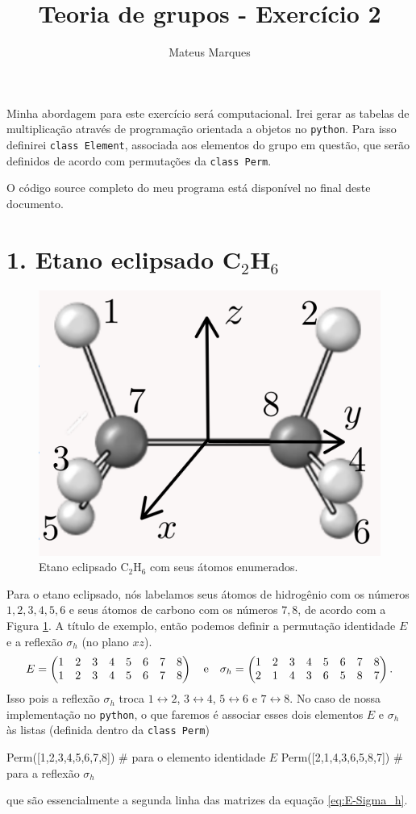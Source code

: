 \documentclass[a4paper,10pt]{article}
\title{\Huge{\textbf{Teoria de grupos - Exercício 2}}}
\author{Mateus Marques}
\newcommand{\python}[1]{\texttt{#1}}
\newcommand{\lr}{\leftrightarrow}
\begin{document}
\maketitle

Minha abordagem para este exercício será computacional. Irei gerar as tabelas de multiplicação através de programação orientada a objetos no \python{python}. Para isso definirei \python{class Element}, associada aos elementos do grupo em questão, que serão definidos de acordo com permutações da \python{class Perm}.

O código source completo do meu programa está disponível no final deste documento.


\section*{1. Etano eclipsado C$_2$H$_6$}

\begin{figure}[H]
\centering
\includegraphics[width=0.3\linewidth]{fig/etano_eclipsado.png}
\caption{Etano eclipsado C$_2$H$_6$ com seus átomos enumerados.}
\label{fig:etano_eclipsado}
\end{figure}

Para o etano eclipsado, nós labelamos seus átomos de hidrogênio com os números $1,2,3,4,5,6$ e seus átomos de carbono com os números $7,8$, de acordo com a Figura \ref{fig:etano_eclipsado}. A título de exemplo, então podemos definir a permutação identidade $E$ e a reflexão $\sigma_h$ (no plano $xz$).
\begin{equation} \label{eq:E-Sigma_h}
E =
\begin{pmatrix}
1 & 2 & 3 & 4 & 5 & 6 & 7 & 8 \\
1 & 2 & 3 & 4 & 5 & 6 & 7 & 8 \\
\end{pmatrix}
\quad \mathrm{e} \quad
\sigma_h =
\begin{pmatrix}
1 & 2 & 3 & 4 & 5 & 6 & 7 & 8 \\
2 & 1 & 4 & 3 & 6 & 5 & 8 & 7 \\
\end{pmatrix}.
\end{equation}
Isso pois a reflexão $\sigma_h$ troca $1 \lr 2$, $3 \lr 4$, $5 \lr 6$ e $7 \lr 8$. No caso de nossa implementação no \python{python}, o que faremos é associar esses dois elementos $E$ e $\sigma_h$ às listas (definida dentro da \python{class Perm})
\begin{Python}
Perm([1,2,3,4,5,6,7,8])     # para o elemento identidade $E$
Perm([2,1,4,3,6,5,8,7])     # para a reflexão $\sigma_h$
\end{Python}
que são essencialmente a segunda linha das matrizes da equação \ref{eq:E-Sigma_h}.
\end{document}
